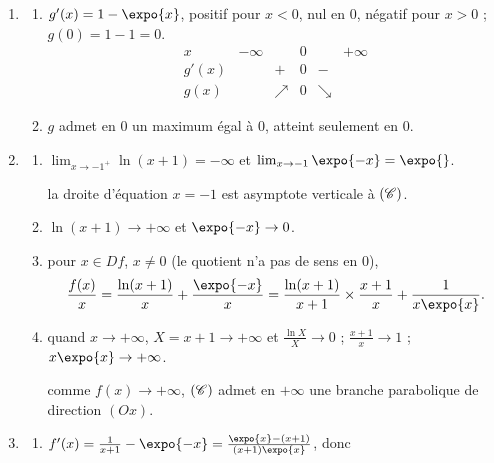 	\begin{enumerate}
		\item \begin{enumerate}
			\item {}
				$g'(x) = 1 - \expo{x}$, positif pour $x < 0$, nul en $0$, négatif pour $x > 0$ ; $g(0) = 1 - 1 = 0$.
				\[
				\begin{array}{c|ccccc}
					x & -\infty & & 0 & & +\infty \\ \hline
					g'(x) & & + & 0 & - & \\ \hline
					g(x) & & \nearrow & 0 & \searrow &
				\end{array}
				\]
			\item {} $g$ admet en $0$ un maximum égal à $0$, atteint seulement en $0$.

		\end{enumerate}
		\item \begin{enumerate}
			\item {}
				$\lim_{x\to-1^+}\ln(x+1) = -\infty$ et $\lim_{x\to-1}\expo{-x} = \expo{}$.


				la droite d'équation $x = -1$ est asymptote verticale à $(\mathscr{C})$.
			\item {} $\ln(x+1) \to +\infty$ et $\expo{-x} \to 0$.

			\item {} pour $x \in Df$, $x \neq 0$ (le quotient n'a pas de sens en $0$),
				\[
					\frac{f(x)}{x} = \frac{\ln(x+1)}{x} + \frac{\expo{-x}}{x} = \frac{\ln(x+1)}{x+1}\times\frac{x+1}{x} + \frac{1}{x\expo{x}}.
				\]
			\item {}
				quand $x \to +\infty$, $X = x + 1 \to +\infty$ et $\frac{\ln X}{X} \to 0$ ; $\frac{x+1}{x} \to 1$ ; $x\expo{x} \to +\infty$.


				comme $f(x) \to +\infty$, $(\mathscr{C})$ admet en $+\infty$ une branche parabolique de direction $(Ox)$.
		\end{enumerate}
		\item \begin{enumerate}
			\item {}
				$f'(x) = \frac{1}{x+1} - \expo{-x} = \frac{\expo{x} - (x+1)}{(x+1)\expo{x}}$, donc


\end{enumerate}
\end{enumerate}
